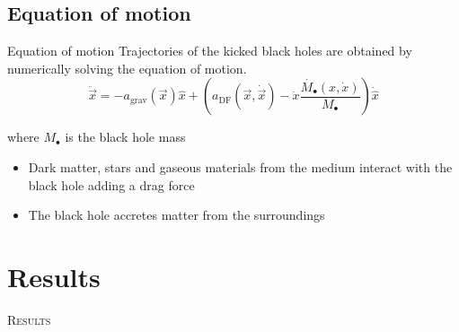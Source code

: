 \documentclass[handout]{beamer}
\begin{document}
\subsection{Equation of motion}
\begin{frame}{Equation of motion}
	Trajectories of the kicked black holes are obtained by numerically solving the equation of motion.
	\begin{equation}\label{eq: equationMotion}
		\ddot{\vec{x}} = -a_\text{grav}(\vec{x})\hat{x} + \left(a_\text{DF}(\vec{x}, \dot{\vec{x}})-\dot{x}\dfrac{\dot{M_\bullet}(x, \dot{x})}{M_\bullet}\right)\dot{\hat{x}} 
	\end{equation}
	
	where $M_\bullet$ is the black hole mass
	
	\begin{itemize}
		\item Dark matter, stars and gaseous materials from the medium interact with the black hole adding a drag force
		\item The black hole accretes matter from the surroundings
	\end{itemize}
\end{frame}

\section{Results}
\begin{frame}
	\centering
	\Huge
	\scshape
	Results
\end{frame}
\end{document}

